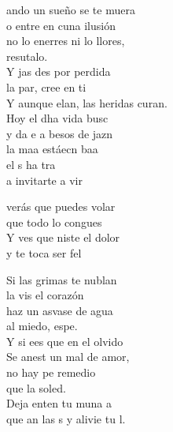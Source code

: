 \begin{cancion}%
	ando un sueño se te muera\\
	o entre en cuna ilusión\\
	no lo enerres ni lo llores, \\
	resutalo. \\
	Y jas des por perdida \\
	la par, cree en ti\\
	Y aunque elan, las heridas curan. \\
	Hoy el dha vida busc\\
	y  da e a besos de jazn \\
	la maa estáecn baa  \\
	el s  ha tra \\
	a invitarte a vir\jump\\
	\begin{chorus}%
		verás que puedes volar\\
		que todo lo congues\\
		Y ves que niste el dolor \\
		y te toca ser fel\jump\\
	\end{chorus}%
	Si las grimas te nublan \\
	la vis el corazón\\
	haz un asvase de agua\\
	al miedo, espe.\\
	Y si ees que en el olvido\\
	Se anest un mal de amor,\\
	no hay pe remedio\\
	que la soled.\\
	Deja enten tu muna a\\
	que an las s y alivie tu l.\\

\end{cancion}
